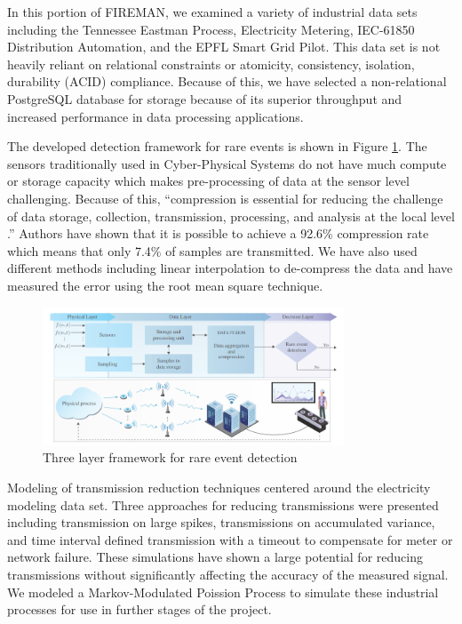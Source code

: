 In this portion of FIREMAN, we examined a  variety of industrial data sets including the Tennessee Eastman Process, Electricity Metering, IEC-61850 Distribution Automation, and the EPFL Smart Grid Pilot. This data set is not heavily reliant on relational constraints or atomicity, consistency, isolation, durability (ACID) compliance. Because of this, we have selected a non-relational PostgreSQL database for storage because of its superior throughput and increased performance in data processing applications.

The developed detection framework for rare events is shown in Figure \ref{fig:three-layer}. The sensors traditionally used in Cyber-Physical Systems do not have much compute or storage capacity which makes pre-processing of data at the sensor level challenging. Because of this, \enquote{compression is essential for reducing the challenge of data storage, collection, transmission, processing, and analysis at the local level \parencite{compression}.} Authors \cite{wp3.2} have shown that it is possible to achieve a 92.6\% compression rate which means that only 7.4\% of samples are transmitted. We have also used different methods including linear interpolation to de-compress the data and have measured the error using the root mean square technique. 

\begin{figure}[H]
    \includegraphics[width=0.8\textwidth]{Images/three-layer-system.PNG}
    \caption{Three layer framework for rare event detection \parencite{three-layer-approach}}
    \label{fig:three-layer}
\end{figure}

Modeling of transmission reduction techniques centered around the electricity modeling data set. Three approaches for reducing transmissions were presented including transmission on large spikes, transmissions on accumulated variance, and time interval defined transmission with a timeout to compensate for meter or network failure. These simulations have shown a large potential for reducing transmissions without significantly affecting the accuracy of the measured signal. We modeled a Markov-Modulated Poission Process to simulate these industrial processes for use in further stages of the project.


